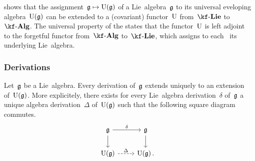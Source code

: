 \begin{remark}
   shows that the assignment~$\glie \mapsto \Univ(\glie)$ of a Lie~algebra~$\mathfrak{g}$ to its universal eveloping algebra~$\operatorname{U}(\mathfrak{g})$ can be extended to a (covariant) functor~$\operatorname{U}$ from~$\cLie{\kf}$ to~$\cAlg{\kf}$.
  The universal property of the {\ua} states that the functor~$\operatorname{U}$ is left adjoint to the forgetful functor from~$\cAlg{\kf}$ to~$\cLie{\kf}$, which assigns to each~{\algebra{$\kf$}} its underlying Lie~algebra.
\end{remark}

\subsubsection{Derivations}

\begin{proposition}
  \label{extending derivation to universal enveloping algebra}
  Let~$\mathfrak{g}$ be a Lie~algebra.
  Every derivation of~$\mathfrak{g}$ extends uniquely to an extension of~$\operatorname{U}(\mathfrak{g})$.
  More explicitely, there exists for every Lie~algebra derivation~$\delta$ of~$\mathfrak{g}$ a unique algebra derivation~$\Delta$ of~$\operatorname{U}(\mathfrak{g})$ such that the following square diagram commutes.
  \[
    \begin{tikzcd}
      \glie
      \arrow{r}[above]{\delta}
      \arrow{d}
      &
      \glie
      \arrow{d}
      \\
      \Univ(\glie)
      \arrow[dashed]{r}[above]{\Delta}
      &
      \Univ(\glie) \,.
    \end{tikzcd}
  \]
\end{proposition}


